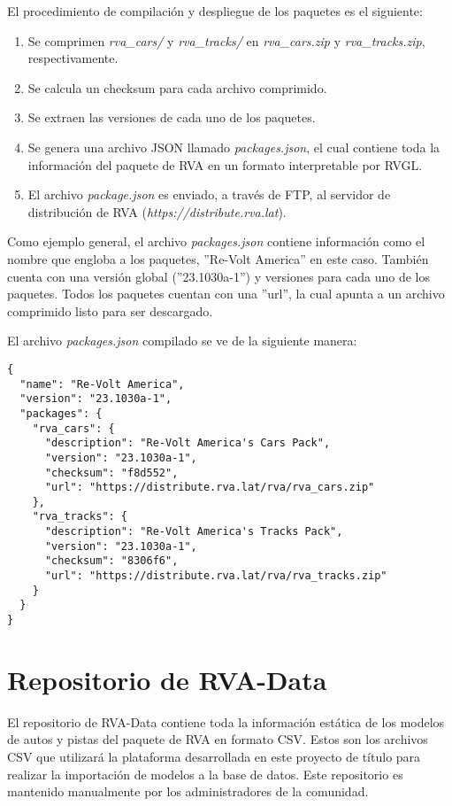 El procedimiento de compilación y despliegue de los paquetes es el siguiente:
\begin{enumerate}
  \item Se comprimen \textit{rva\_cars/} y \textit{rva\_tracks/} en \textit{rva\_cars.zip} y \textit{rva\_tracks.zip}, respectivamente.
  \item Se calcula un checksum para cada archivo comprimido.
  \item Se extraen las versiones de cada uno de los paquetes.
  \item Se genera una archivo JSON llamado \textit{packages.json}, el cual contiene toda la información del paquete de RVA en un formato interpretable por RVGL.
  \item El archivo \textit{package.json} es enviado, a través de FTP, al servidor de distribución de RVA (\textit{https://distribute.rva.lat}).
\end{enumerate}

Como ejemplo general, el archivo \textit{packages.json} contiene información como el nombre que engloba a los paquetes, ''Re-Volt America'' en este caso. También cuenta con una versión global (''23.1030a-1'') y versiones para cada uno de los paquetes. Todos los paquetes cuentan con una ''url'', la cual apunta a un archivo comprimido listo para ser descargado.

El archivo \textit{packages.json} compilado se ve de la siguiente manera:

\begin{longlisting}
  \begin{verbatim}  
{
  "name": "Re-Volt America",
  "version": "23.1030a-1",
  "packages": {
    "rva_cars": {
      "description": "Re-Volt America's Cars Pack",
      "version": "23.1030a-1",
      "checksum": "f8d552",
      "url": "https://distribute.rva.lat/rva/rva_cars.zip"
    },
    "rva_tracks": {
      "description": "Re-Volt America's Tracks Pack",
      "version": "23.1030a-1",
      "checksum": "8306f6",
      "url": "https://distribute.rva.lat/rva/rva_tracks.zip"
    }
  }
}
  \end{verbatim}
\end{longlisting}

\newpage

\section{Repositorio de RVA-Data}
El repositorio de RVA-Data contiene toda la información estática de los modelos de autos y pistas del paquete de RVA en formato CSV. Estos son los archivos CSV que utilizará la plataforma desarrollada en este proyecto de título para realizar la importación de modelos a la base de datos. Este repositorio es mantenido manualmente por los administradores de la comunidad.

